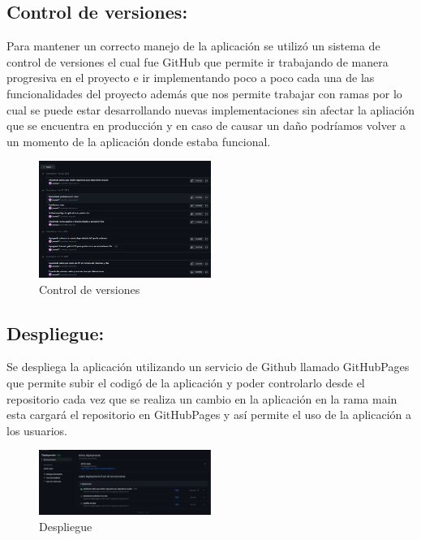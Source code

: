 \documentclass[12pt]{article}
\begin{document}
        \subsection{Control de versiones: }

        Para mantener un correcto manejo de la aplicación se utilizó un sistema de control de versiones el cual fue GitHub que permite ir trabajando de manera progresiva en el proyecto e ir implementando poco a poco cada una de las funcionalidades del proyecto además que nos permite trabajar con ramas por lo cual se puede estar desarrollando nuevas implementaciones sin afectar la apliación que se encuentra en producción y en caso de causar un daño podríamos volver a un momento de la aplicación donde estaba funcional.
        \begin{figure}[h]
            \centering
            \includegraphics[width=0.5\textwidth]{img/controlversion.png}
            \caption{Control de versiones}
            \label{figure:controlversion}
        \end{figure}

        \subsection{Despliegue:}

        Se despliega la aplicación utilizando un servicio de Github llamado GitHubPages que permite subir el codigó de la aplicación y poder controlarlo desde el repositorio cada vez que se realiza un cambio en la aplicación en la rama main esta cargará el repositorio en GitHubPages y así permite el uso de la aplicación a los usuarios.

        \begin{figure}[h]
            \centering
            \includegraphics[width=0.5\textwidth]{img/deploy.png}
            \caption{Despliegue}
            \label{figure:Deploy}
        \end{figure}
\end{document}
